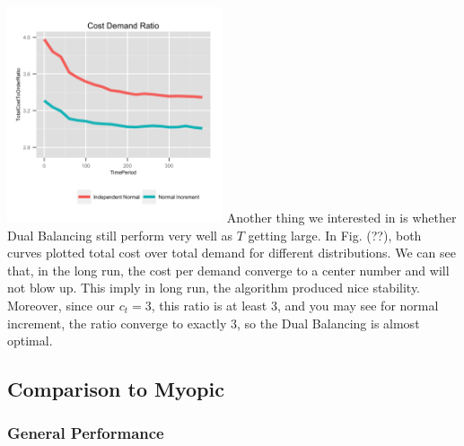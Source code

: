 \documentclass[twoside]{article}
\begin{document}
\begin{multicols}{2}
  \includegraphics[width=2.5in]{figures/TotalCostToOrderRatio.png}
  Another thing we interested in is whether Dual Balancing still perform very well as $T$ getting large. In Fig. (??), both curves plotted total cost over total demand for different distributions. We can see that, in the long run, the cost per demand converge to a center number and will not blow up. This imply in long run, the algorithm produced nice stability. Moreover, since our $c_t=3$, this ratio is at least 3, and you may see for normal increment, the ratio converge to exactly 3, so the Dual Balancing is almost optimal. 

\subsection{Comparison to Myopic}
\subsubsection{General Performance}


\end{multicols}
\end{document}
